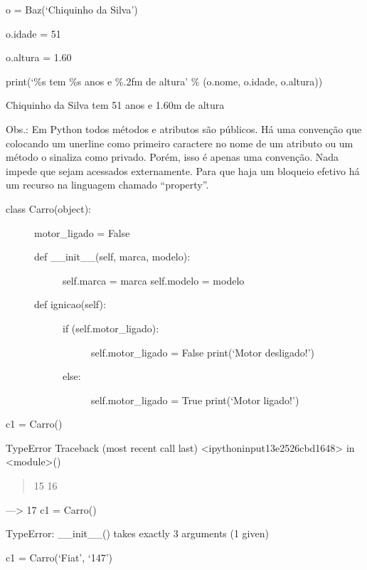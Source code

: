 \documentclass[letterpaper,10pt,brazil]{sphinxmanual}
\begin{document}
o = Baz(‘Chiquinho da Silva’)

o.idade = 51

o.altura = 1.60

print(‘\%s tem \%s anos e \%.2fm de altura’ \% (o.nome, o.idade, o.altura))

Chiquinho da Silva tem 51 anos e 1.60m de altura

Obs.: Em Python todos métodos e atributos são públicos.
Há uma convenção que colocando um unerline como primeiro caractere no nome de um atributo ou um método o sinaliza como privado.
Porém, isso é apenas uma convenção. Nada impede que sejam acessados externamente.
Para que haja um bloqueio efetivo há um recurso na linguagem chamado “property”.
\begin{description}
\item[{class Carro(object):}] \leavevmode
motor\_ligado = False
\begin{description}
\item[{def \_\_init\_\_(self, marca, modelo):}] \leavevmode
self.marca = marca
self.modelo = modelo

\item[{def ignicao(self):}] \leavevmode\begin{description}
\item[{if (self.motor\_ligado):}] \leavevmode
self.motor\_ligado = False
print(‘Motor desligado!’)

\item[{else:}] \leavevmode
self.motor\_ligado = True
print(‘Motor ligado!’)

\end{description}

\end{description}

\end{description}

c1 = Carro()

TypeError                                 Traceback (most recent call last)
\textless{}ipython\sphinxhyphen{}input\sphinxhyphen{}13\sphinxhyphen{}e2526cbd1648\textgreater{} in \textless{}module\textgreater{}()
\begin{quote}

15
16
\end{quote}

—\textgreater{} 17 c1 = Carro()

TypeError: \_\_init\_\_() takes exactly 3 arguments (1 given)

c1 = Carro(‘Fiat’, ‘147’)
\end{document}
